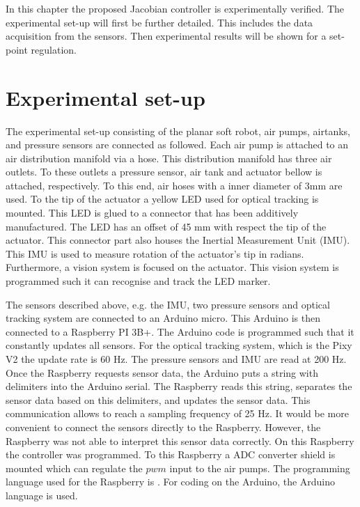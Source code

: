 \label{chap5}



In this chapter the proposed Jacobian controller is experimentally verified. The experimental set-up will first be further detailed. This includes the data acquisition from the sensors. Then experimental results will be shown for a set-point regulation.  


\section{Experimental set-up}

The experimental set-up consisting of the planar soft robot, air pumps, airtanks, and pressure sensors are connected as followed. Each air pump is attached to an air distribution manifold via a hose. This distribution manifold has three air outlets. To these outlets a pressure sensor, air tank and actuator bellow is attached, respectively. To this end, air hoses with a inner diameter of 3mm are used. To the tip of the actuator a yellow LED used for optical tracking is mounted. This LED is glued to a connector that has been additively manufactured. The LED has an offset of 45 mm with respect the tip of the actuator. This connector part also houses the Inertial Measurement Unit (IMU). This IMU is used to measure  rotation of the actuator's tip in radians. Furthermore, a vision system is focused on the actuator. This vision system is programmed such it can recognise and track the LED marker. 

The sensors described above, e.g. the IMU, two pressure sensors and optical tracking system are connected to an Arduino micro. This Arduino is then connected to a Raspberry PI 3B+. The Arduino code is programmed such that it constantly updates all sensors. For the optical tracking system, which is the Pixy V2 the update rate is 60 Hz. The pressure sensors and IMU are read at 200 Hz. Once the Raspberry requests sensor data, the Arduino puts a string with delimiters into the Arduino serial. The Raspberry reads this string, separates the sensor data based on this delimiters, and updates the sensor data. This communication allows to reach a sampling frequency of 25 Hz. It would be more convenient to connect the sensors directly to the Raspberry. However, the Raspberry was not able to interpret this sensor data correctly. On this Raspberry the controller was programmed. To this Raspberry a ADC converter shield is mounted which can regulate the $pwm$ input to the air pumps. The programming language used for the Raspberry is \CC. For coding on the Arduino, the Arduino language is used. 

